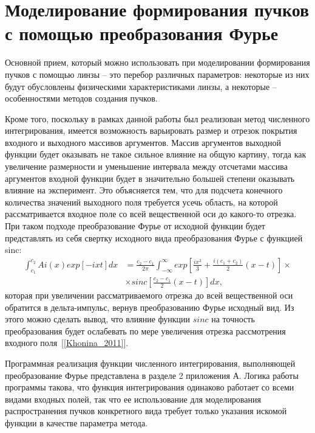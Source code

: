     \section{\nohyphens{Моделирование формирования пучков с помощью преобразования Фурье}}{

    \vspace{-0.2cm}
    Основной прием, который можно использовать при моделировании
    формирования пучков с помощью линзы – это перебор различных параметров:
    некоторые из них будут обусловлены физическими характеристиками линзы, а
    некоторые – особенностями методов создания пучков.

    Кроме того, поскольку в рамках данной работы был реализован метод
    численного интегрирования, имеется возможность варьировать размер и отрезок покрытия
    входного и выходного массивов аргументов. Массив аргументов выходной
    функции будет оказывать не такое сильное влияние на общую картину, тогда
    как увеличение размерности и уменьшение интервала между отсчетами массива
    аргументов входной функции будет в значительно большей степени оказывать
    влияние на эксперимент. Это объясняется тем, что для подсчета конечного
    количества значений выходного поля требуется усечь область, на которой
    рассматривается входное поле со всей вещественной оси до какого-то отрезка.
    При таком подходе преобразование Фурье от исходной функции будет
    представлять из себя свертку исходного вида преобразования Фурье с
    функцией sinc:
    \begin{align*}
        \int^{c_2}_{c_1} Ai(x)exp[-ixt]dx &= \frac{c_2-c_1}{2\pi}\int^{\infty}_{-\infty}exp[\frac{ix^3}{3} + \frac{i(c_1+c_2)}{2}(x-t)] \times\\
        & \times sinc[\frac{c_2-c_1}{2}(x-t)]dx,
    \end{align*}
    которая при увеличении рассматриваемого отрезка до всей
    вещественной оси обратится в дельта-импульс, вернув преобразованию Фурье
    исходный вид. Из этого можно сделать вывод, что влияние функции $sinc$ на
    точность преобразования будет ослабевать по мере увеличения отрезка
    рассмотрения входного поля~[\ref{Khonina_2011}].

    Программная реализация функции численного интегрирования,
    выполняющей преобразование Фурье представлена в разделе 2 приложения А. Логика
    работы программы такова, что функция интегрирования одинаково
    работает со всеми видами входных полей, так что ее использование для
    моделирования распространения пучков конкретного вида требует только
    указания искомой функции в качестве параметра метода.

}
